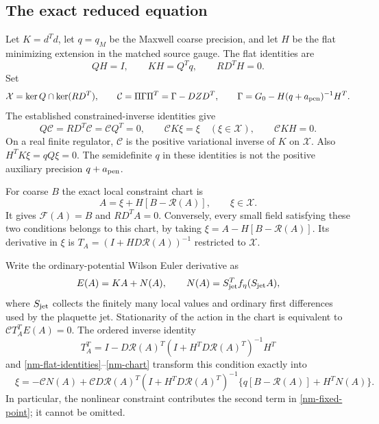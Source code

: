 \subsection{The exact reduced equation}
\label{nm-reduction}

Let $K=d^Td$, let $q=q_M$ be the Maxwell coarse precision, and let
$H$ be the flat minimizing extension in the matched source gauge.
The flat identities are
\begin{equation}\label{nm-flat-identities}
 QH=I,\qquad KH=Q^Tq,\qquad RD^TH=0.
\end{equation}
Set
\begin{equation}\label{nm-slice-green}
 \mathcal X=\ker Q\cap\ker(RD^T),\qquad
 \mathcal C=\Pi\Gamma\Pi^T=\Gamma-DZD^T,
 \qquad \Gamma=G_0-H(q+a_{\rm pen})^{-1}H^T.
\end{equation}
The established constrained-inverse identities give
\begin{equation}\label{nm-constrained-identities}
 Q\mathcal C=RD^T\mathcal C=\mathcal C Q^T=0,\qquad
 \mathcal C K\xi=\xi\quad(\xi\in\mathcal X),\qquad
 \mathcal C KH=0.
\end{equation}
On a real finite regulator, $\mathcal C$ is the positive
variational inverse of $K$ on $\mathcal X$. Also
$H^TK\xi=qQ\xi=0$. The semidefinite $q$ in these identities is
not the positive auxiliary precision $q+a_{\rm pen}$.

For coarse $B$ the exact local constraint chart is
\begin{equation}\label{nm-chart}
 A=\xi+H[B-\mathcal R(A)],\qquad \xi\in\mathcal X.
\end{equation}
It gives $\mathcal F(A)=B$ and $RD^TA=0$. Conversely, every small
field satisfying these two conditions belongs to this chart,
by taking $\xi=A-H[B-\mathcal R(A)]$. Its derivative in $\xi$ is
$T_A=(I+HD\mathcal R(A))^{-1}$ restricted to $\mathcal X$.

Write the ordinary-potential Wilson Euler derivative as
\begin{equation}\label{nm-force}
 E(A)=KA+N(A),\qquad N(A)=S_{\rm jet}^Tf_\eta(S_{\rm jet}A),
\end{equation}
where $S_{\rm jet}$ collects the finitely many local values and
ordinary first differences used by the plaquette jet. Stationarity
of the action in the chart is equivalent to
$\mathcal C T_A^TE(A)=0$. The ordered inverse identity
\[
 T_A^T=I-D\mathcal R(A)^T
       (I+H^TD\mathcal R(A)^T)^{-1}H^T
\]
and \eqref{nm-flat-identities}--\eqref{nm-chart} transform this
condition exactly into
\begin{equation}\label{nm-fixed-point}
 \boxed{\quad
 \xi=-\mathcal C N(A)
 +\mathcal C D\mathcal R(A)^T
       (I+H^TD\mathcal R(A)^T)^{-1}
       \{q[B-\mathcal R(A)]+H^TN(A)\}.
 \quad}
\end{equation}
In particular, the nonlinear constraint contributes the second
term in \eqref{nm-fixed-point}; it cannot be omitted.

